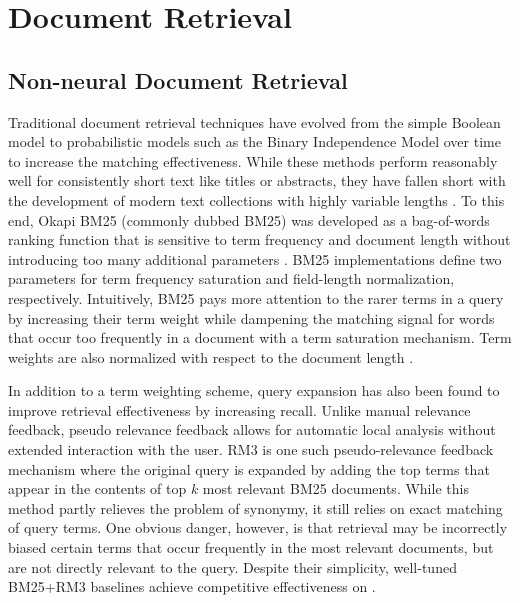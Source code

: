 \section{Document Retrieval}

\subsection{Non-neural Document Retrieval}
\label{non-neural-retrieval}

Traditional document retrieval techniques have evolved from the simple Boolean model to probabilistic models such as the Binary Independence Model over time to increase the matching effectiveness.
While these methods perform reasonably well for consistently short text like titles or abstracts, they have fallen short with the development of modern text collections with highly variable lengths .
To this end, Okapi BM25 (commonly dubbed BM25) was developed as a bag-of-words ranking function that is sensitive to term frequency and document length without introducing too many additional parameters \cite{jones2000probabilistic}.
BM25 implementations define two parameters for term frequency saturation and field-length normalization, respectively.
Intuitively, BM25 pays more attention to the rarer terms in a query by increasing their term weight while dampening the matching signal for words that occur too frequently in a document with a term saturation mechanism.
Term weights are also normalized with respect to the document length .

In addition to a term weighting scheme, query expansion has also been found to improve retrieval effectiveness by increasing recall.
Unlike manual relevance feedback, pseudo relevance feedback allows for automatic local analysis without extended interaction with the user.
RM3 is one such pseudo-relevance feedback mechanism where the original query is expanded by adding the top terms that appear in the contents of top $ k $ most relevant BM25 documents.
While this method partly relieves the problem of synonymy, it still relies on exact matching of query terms.
One obvious danger, however, is that retrieval may be incorrectly biased certain terms that occur frequently in the most relevant documents, but are not directly relevant to the query.
Despite their simplicity, well-tuned BM25+RM3 baselines achieve competitive effectiveness on 
 \cite{lin2019neural}.

